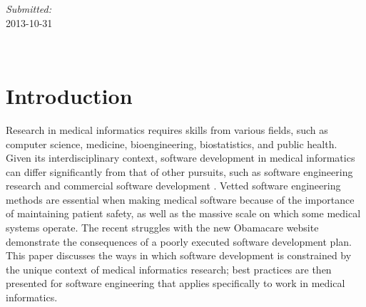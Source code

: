 \documentclass[12pt]{article} %
\begin{document}
\begin{titlepage}

\begin{minipage}{0.4\textwidth}
\begin{center} \large
\emph{Submitted:} \\
2013-10-31 %
\end{center}
\end{minipage}\\[4cm]

\vfill %
\end{titlepage}


\fontsize{12}{27.95}%
\selectfont

\section{Introduction}

Research in medical informatics requires skills from various fields, such as computer science, medicine, bioengineering, biostatistics, and public health.
Given its interdisciplinary context, software development in medical informatics can differ significantly from that of other pursuits, such as software engineering research and commercial software development \cite{weber2013}.
Vetted software engineering methods are essential when making medical software because of the importance of maintaining patient safety, as well as the massive scale on which some medical systems operate.
The recent struggles with the new Obamacare website demonstrate the consequences of a poorly executed software development plan.
This paper discusses the ways in which software development is constrained by the unique context of medical informatics research; best practices are then presented for software engineering that applies specifically to work in medical informatics.
\end{document}
